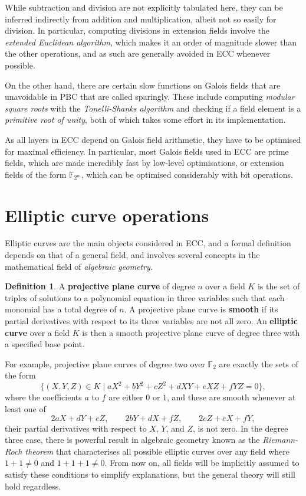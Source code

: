 \documentclass{article}
\theoremstyle{definition}
\newtheorem{definition}{Definition}
\newcommand{\F}{\mathbb{F}}
\begin{document}
While subtraction and division are not explicitly tabulated here, they can be inferred indirectly from addition and multiplication, albeit not so easily for division. In particular, computing divisions in extension fields involve the \emph{extended Euclidean algorithm}, which makes it an order of magnitude slower than the other operations, and as such are generally avoided in ECC whenever possible.

On the other hand, there are certain slow functions on Galois fields that are unavoidable in PBC that are called sparingly. These include computing \emph{modular square roots} with the \emph{Tonelli-Shanks algorithm} and checking if a field element is a \emph{primitive root of unity}, both of which takes some effort in its implementation.

As all layers in ECC depend on Galois field arithmetic, they have to be optimised for maximal efficiency. In particular, most Galois fields used in ECC are prime fields, which are made incredibly fast by low-level optimisations, or extension fields of the form $ \F_{2^m} $, which can be optimised considerably with bit operations.

\section{Elliptic curve operations}

Elliptic curves are the main objects considered in ECC, and a formal definition depends on that of a general field, and involves several concepts in the mathematical field of \emph{algebraic geometry}.

\begin{definition}
A \textbf{projective plane curve} of degree $ n $ over a field $ K $ is the set of triples of solutions to a polynomial equation in three variables such that each monomial has a total degree of $ n $. A projective plane curve is \textbf{smooth} if its partial derivatives with respect to its three variables are not all zero. An \textbf{elliptic curve} over a field $ K $ is then a smooth projective plane curve of degree three with a specified base point.
\end{definition}

For example, projective plane curves of degree two over $ \F_2 $ are exactly the sets of the form
$$ \{ (X, Y, Z) \in K \mid aX^2 + bY^2 + cZ^2 + dXY + eXZ + fYZ = 0 \}, $$
where the coefficients $ a $ to $ f $ are either $ 0 $ or $ 1 $, and these are smooth whenever at least one of
$$ 2aX + dY + eZ, \qquad 2bY + dX + fZ, \qquad 2cZ + eX + fY, $$
their partial derivatives with respect to $ X $, $ Y $, and $ Z $, is not zero. In the degree three case, there is powerful result in algebraic geometry known as the \emph{Riemann-Roch theorem} that characterises all possible elliptic curves over any field where $ 1 + 1 \ne 0 $ and $ 1 + 1 + 1 \ne 0 $. From now on, all fields will be implicitly assumed to satisfy these conditions to simplify explanations, but the general theory will still hold regardless.
\end{document}
